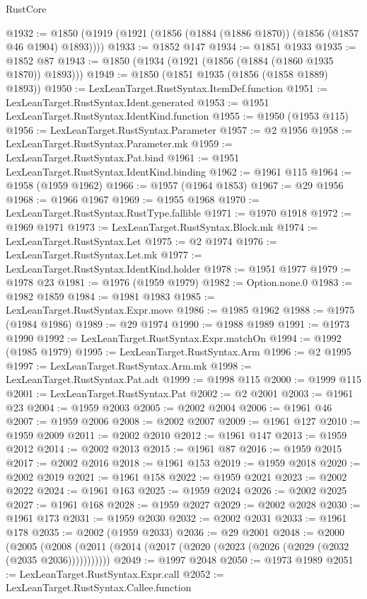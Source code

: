 \begin{lexlean}{RustCore}
\begin{coremodule}
@1932 := @1850 (@1919 (@1921 (@1856 (@1884 (@1886 @1870)) (@1856 (@1857 @46 @1904) @1893))))
@1933 := @1852 @147
@1934 := @1851 @1933
@1935 := @1852 @87
@1943 := @1850 (@1934 (@1921 (@1856 (@1884 (@1860 @1935 @1870)) @1893)))
@1949 := @1850 (@1851 @1935 (@1856 (@1858 @1889) @1893))
@1950 := LexLeanTarget.RustSyntax.ItemDef.function
@1951 := LexLeanTarget.RustSyntax.Ident.generated
@1953 := @1951 LexLeanTarget.RustSyntax.IdentKind.function
@1955 := @1950 (@1953 @115)
@1956 := LexLeanTarget.RustSyntax.Parameter
@1957 := @2 @1956
@1958 := LexLeanTarget.RustSyntax.Parameter.mk
@1959 := LexLeanTarget.RustSyntax.Pat.bind
@1961 := @1951 LexLeanTarget.RustSyntax.IdentKind.binding
@1962 := @1961 @115
@1964 := @1958 (@1959 @1962)
@1966 := @1957 (@1964 @1853)
@1967 := @29 @1956
@1968 := @1966 @1967
@1969 := @1955 @1968
@1970 := LexLeanTarget.RustSyntax.RustType.fallible
@1971 := @1970 @1918
@1972 := @1969 @1971
@1973 := LexLeanTarget.RustSyntax.Block.mk
@1974 := LexLeanTarget.RustSyntax.Let
@1975 := @2 @1974
@1976 := LexLeanTarget.RustSyntax.Let.mk
@1977 := LexLeanTarget.RustSyntax.IdentKind.holder
@1978 := @1951 @1977
@1979 := @1978 @23
@1981 := @1976 (@1959 @1979)
@1982 := Option.none.{0}
@1983 := @1982 @1859
@1984 := @1981 @1983
@1985 := LexLeanTarget.RustSyntax.Expr.move
@1986 := @1985 @1962
@1988 := @1975 (@1984 @1986)
@1989 := @29 @1974
@1990 := @1988 @1989
@1991 := @1973 @1990
@1992 := LexLeanTarget.RustSyntax.Expr.matchOn
@1994 := @1992 (@1985 @1979)
@1995 := LexLeanTarget.RustSyntax.Arm
@1996 := @2 @1995
@1997 := LexLeanTarget.RustSyntax.Arm.mk
@1998 := LexLeanTarget.RustSyntax.Pat.adt
@1999 := @1998 @115
@2000 := @1999 @115
@2001 := LexLeanTarget.RustSyntax.Pat
@2002 := @2 @2001
@2003 := @1961 @23
@2004 := @1959 @2003
@2005 := @2002 @2004
@2006 := @1961 @46
@2007 := @1959 @2006
@2008 := @2002 @2007
@2009 := @1961 @127
@2010 := @1959 @2009
@2011 := @2002 @2010
@2012 := @1961 @147
@2013 := @1959 @2012
@2014 := @2002 @2013
@2015 := @1961 @87
@2016 := @1959 @2015
@2017 := @2002 @2016
@2018 := @1961 @153
@2019 := @1959 @2018
@2020 := @2002 @2019
@2021 := @1961 @158
@2022 := @1959 @2021
@2023 := @2002 @2022
@2024 := @1961 @163
@2025 := @1959 @2024
@2026 := @2002 @2025
@2027 := @1961 @168
@2028 := @1959 @2027
@2029 := @2002 @2028
@2030 := @1961 @173
@2031 := @1959 @2030
@2032 := @2002 @2031
@2033 := @1961 @178
@2035 := @2002 (@1959 @2033)
@2036 := @29 @2001
@2048 := @2000
    (@2005 (@2008 (@2011 (@2014 (@2017 (@2020 (@2023 (@2026 (@2029 (@2032 (@2035 @2036)))))))))))
@2049 := @1997 @2048
@2050 := @1973 @1989
@2051 := LexLeanTarget.RustSyntax.Expr.call
@2052 := LexLeanTarget.RustSyntax.Callee.function

\end{coremodule}
\end{lexlean}
